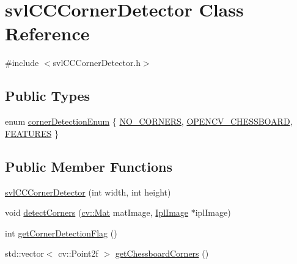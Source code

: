 \hypertarget{classsvl_c_c_corner_detector}{}\section{svl\+C\+C\+Corner\+Detector Class Reference}
\label{classsvl_c_c_corner_detector}


{\ttfamily \#include $<$svl\+C\+C\+Corner\+Detector.\+h$>$}

\subsection*{Public Types}
\begin{DoxyCompactItemize}
\item 
enum \hyperlink{classsvl_c_c_corner_detector_a50a5ca9344335a09a544cc7c4e3481d4}{corner\+Detection\+Enum} \{ \hyperlink{classsvl_c_c_corner_detector_a50a5ca9344335a09a544cc7c4e3481d4a3449dc3faed7b2837c56942e6e5a4bbd}{N\+O\+\_\+\+C\+O\+R\+N\+E\+R\+S}, 
\hyperlink{classsvl_c_c_corner_detector_a50a5ca9344335a09a544cc7c4e3481d4aca65612af3840560ad3a6472318ceb0e}{O\+P\+E\+N\+C\+V\+\_\+\+C\+H\+E\+S\+S\+B\+O\+A\+R\+D}, 
\hyperlink{classsvl_c_c_corner_detector_a50a5ca9344335a09a544cc7c4e3481d4a70f7c0ba4e67fdbacfb5f213693a057f}{F\+E\+A\+T\+U\+R\+E\+S}
 \}
\end{DoxyCompactItemize}
\subsection*{Public Member Functions}
\begin{DoxyCompactItemize}
\item 
\hyperlink{classsvl_c_c_corner_detector_a3a5431e2865fe321e0ff3e94ab6ca0ba}{svl\+C\+C\+Corner\+Detector} (int width, int height)
\item 
void \hyperlink{classsvl_c_c_corner_detector_ac05cb12f874f206d83e3e332ca65b196}{detect\+Corners} (\hyperlink{namespacecv_a60d81b54f4914bec4cc4a72ab77eb444}{cv\+::\+Mat} mat\+Image, \hyperlink{svl_types_8h_aa5a40a13021ba9708bfe921e18fdfa53}{Ipl\+Image} $\ast$ipl\+Image)
\item 
int \hyperlink{classsvl_c_c_corner_detector_ac6d1bb5e6915c6cffb2817607a3ca2fa}{get\+Corner\+Detection\+Flag} ()
\item 
std\+::vector$<$ cv\+::\+Point2f $>$ \hyperlink{classsvl_c_c_corner_detector_a3bd8600da0171e5461532a3f15f05195}{get\+Chessboard\+Corners} ()
\end{DoxyCompactItemize}


